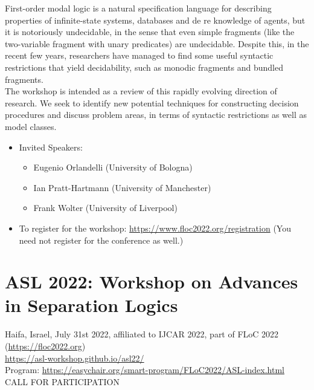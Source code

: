 \documentclass[prodmode,acmtecs]{acmsmall} %
\begin{document}
  First-order modal logic is a natural specification language for describing properties of infinite-state systems, databases and de re knowledge of agents, but it is notoriously undecidable, in the sense that even simple fragments (like the two-variable fragment with unary predicates) are undecidable. Despite this, in the recent few years, researchers have managed to find some useful syntactic restrictions that yield decidability, such as monodic fragments and bundled fragments.\\ 
  The workshop is intended as a review of this rapidly evolving direction of research. We seek to identify new potential techniques for constructing decision procedures and discuss problem areas, in terms of syntactic restrictions as well as model classes.\\ 
\begin{itemize}\item  Invited Speakers: 
 
\begin{itemize}\item  Eugenio Orlandelli (University of Bologna) 
\item  Ian Pratt-Hartmann (University of Manchester) 
\item  Frank Wolter (University of Liverpool)
\end{itemize} 
\item  To register for the workshop: \href{https://www.floc2022.org/registration}{https://www.floc2022.org/registration} (You need not register for the conference as well.) 
 
\end{itemize}\section{ASL 2022: Workshop on Advances in Separation Logics }\label{ASL2022}  Haifa, Israel, July 31st 2022,  affiliated to IJCAR 2022, part of FLoC 2022 (\href{https://floc2022.org}{https://floc2022.org})\\ 
  \href{https://asl-workshop.github.io/asl22/}{https://asl-workshop.github.io/asl22/}\\ 
  Program:  \href{https://easychair.org/smart-program/FLoC2022/ASL-index.html}{https://easychair.org/smart-program/FLoC2022/ASL-index.html}\\ 
CALL FOR PARTICIPATION 
\end{document}
